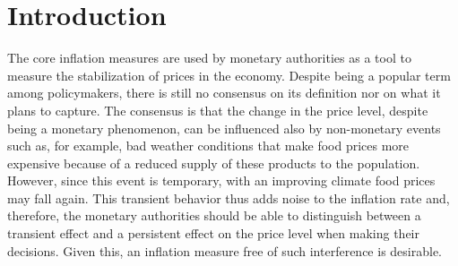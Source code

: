 \documentclass[10pt]{article}
\begin{document}


\section{Introduction}\label{intro}


The core inflation measures are used by monetary authorities as a tool to measure the stabilization of prices in the economy. Despite being a popular term among policymakers, there is still no consensus on its definition nor on what it plans to capture. The consensus is that the change in the price level, despite being a monetary phenomenon, can be influenced also by non-monetary events such as, for example, bad weather conditions that make food prices more expensive because of a reduced supply of these products to the population. However, since this event is temporary, with an improving climate food prices may fall again. This transient behavior thus adds noise to the inflation rate and, therefore, the monetary authorities should be able to distinguish between a transient effect and a persistent effect on the price level when making their decisions. Given this, an inflation measure free of such interference is desirable.

\end{document}
